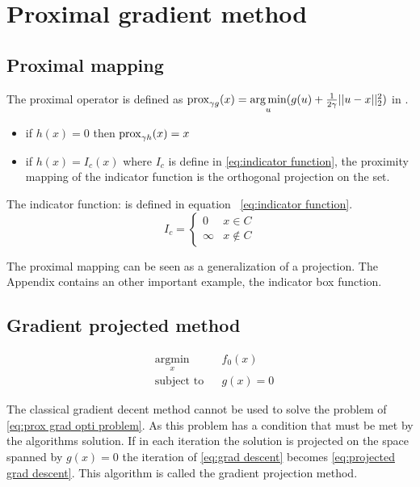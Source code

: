 \chapter{Proximal gradient method}
	\section{Proximal mapping}
		The proximal operator is defined as $\operatorname{prox}_{\gamma g}(x)= \underset{u}{\operatorname*{arg\,min}}(g(u) + \frac{1}{2 \gamma}||u-x||^2_2)$ in \cite{NealParikh}. 
		
		\begin{itemize}
			\item if $h(x)=0$ then $\operatorname{prox}_{\gamma h}(x)=x$ 
			\item if $h(x)=I_c(x)$ where $I_c$ is define in \eqref{eq:indicator function}, the proximity mapping of the indicator function is the orthogonal projection on the set.
		\end{itemize}
		
		The indicator function: is defined in equation ~\eqref{eq:indicator function}.
		\begin{equation}
			I_c = 
			\begin{cases}
			0 & x \in C  \\
			\infty & x \notin C
			\end{cases}
			\label{eq:indicator function}
		\end{equation}
		
		The proximal mapping can be seen as a generalization of a projection. The Appendix contains an other important example, the indicator box function.
	
	\section{Gradient projected method}
		
		\begin{equation}
			\begin{aligned}
			& \underset{x}{\text{argmin}}
			& & f_0(x) \\
			& \text{subject to}
			& & g(x)=0
			\end{aligned}
			\label{eq:prox grad opti problem}
		\end{equation}
		
		The classical gradient decent method cannot be used to solve the problem of \eqref{eq:prox grad opti problem}. As this problem has a condition that must be met by the algorithms solution. If in each iteration the solution is projected on the space spanned by $g(x)=0$ the iteration of \eqref{eq:grad descent} becomes \eqref{eq:projected grad descent}. This algorithm is called the gradient projection method.
		
